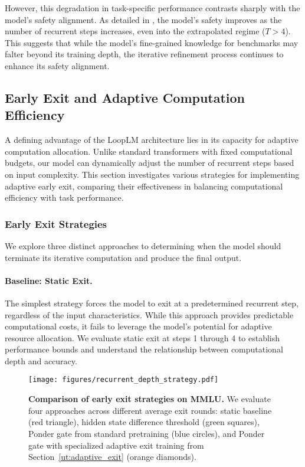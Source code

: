 \documentclass[]{bytedance_seed}
\newcommand{\1}{\mathbf{1}}
\newcommand{\ut}{LoopLM}
\begin{document}
However, this degradation in task-specific performance contrasts sharply with the model's safety alignment. As detailed in , the model's safety improves as the number of recurrent steps increases, even into the extrapolated regime ($T>4$). This suggests that while the model's fine-grained knowledge for benchmarks may falter beyond its training depth, the iterative refinement process continues to enhance its safety alignment.



\subsection{Early Exit and Adaptive Computation Efficiency}

A defining advantage of the \ut{} architecture lies in its capacity for adaptive computation allocation. Unlike standard transformers with fixed computational budgets, our model can dynamically adjust the number of recurrent steps based on input complexity. This section investigates various strategies for implementing adaptive early exit, comparing their effectiveness in balancing computational efficiency with task performance.

\subsubsection{Early Exit Strategies}

We explore three distinct approaches to determining when the model should terminate its iterative computation and produce the final output.

\paragraph{Baseline: Static Exit.}
The simplest strategy forces the model to exit at a predetermined recurrent step, regardless of the input characteristics. While this approach provides predictable computational costs, it fails to leverage the model's potential for adaptive resource allocation. We evaluate static exit at steps 1 through 4 to establish performance bounds and understand the relationship between computational depth and accuracy.
\begin{wrapfigure}{r}{0.5\textwidth}
    \centering
    \texttt{[image: figures/recurrent\_depth\_strategy.pdf]}
    \caption{\textbf{Comparison of early exit strategies on MMLU.} We evaluate four approaches across different average exit rounds: static baseline (red triangle), hidden state difference threshold (green squares), Ponder gate from standard pretraining (blue circles), and Ponder gate with specialized adaptive exit training from Section~\ref{ut:adaptive_exit} (orange diamonds). }
    \label{fig:early_exit_comparison}
    \vspace{-1.2cm}
\end{wrapfigure}
\end{document}
